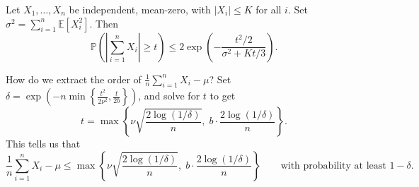 \begin{thm}
Let $X_1, \ldots, X_n$ be independent, mean-zero, with $|X_i| \leq K$ for all $i$. Set $\sigma^2 = \sum_{i=1}^n \mathbb{E}[X_i^2]$. Then
\[
\mathbb{P}\!\left( \left| \sum_{i=1}^n X_i \right| \geq t \right) \leq 2 \exp\!\left( -\frac{t^2 / 2}{\sigma^2 + K t / 3} \right).
\]
\end{thm}

\begin{rem}
    How do we extract the order of $\frac{1}{n}\sum_{i=1}^n X_i - \mu$? Set $\delta = \exp\!\left(-n \min\!\left\{\frac{t^2}{2\nu^2}, \frac{t}{2b}\right\}\right)$, and solve for $t$ to get
    \[
    t = \max\!\left\{ \nu \sqrt{\frac{2 \log(1/\delta)}{n}}, \; b \cdot \frac{2 \log(1/\delta)}{n} \right\}.
    \]
    This tells us that
    \[
    \frac{1}{n} \sum_{i=1}^n X_i - \mu \leq \max\!\left\{ \nu \sqrt{\frac{2 \log(1/\delta)}{n}}, \; b \cdot \frac{2 \log(1/\delta)}{n} \right\} \qquad \text{with probability at least } 1 - \delta.
    \]
\end{rem}

